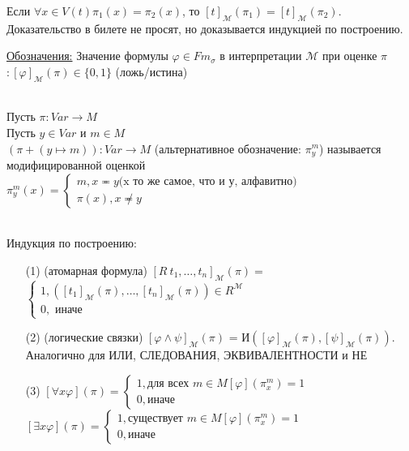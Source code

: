\documentclass[a4paper, fleqn]{article}
\begin{document}
    \begin{lemma}
        Если $∀ x ∈ V(t) \pi_1(x) = \pi_2(x)$, то 
        $[t]_{\mathcal{M}}(\pi_1) = [t]_{\mathcal{M}}(\pi_2)$. \\
        Доказательство в билете не просят,
         но доказывается индукцией по построению.
    \end{lemma}
    \underline{Обозначения:} Значение формулы $\varphi ∈ Fm_{\sigma}$ в интерпретации
    $\mathcal{M}$ при оценке $\pi$ $: [\varphi]_{\mathcal{M}}(\pi) ∈ \{0, 1\}$ (ложь/истина) \\
    \begin{definition} \ \\
        Пусть $\pi: Var → M$ \\
        Пусть $y ∈ Var$ и $m ∈ M$ \\
        $(\pi+(y ↦ m)): Var → M$ (альтернативное обозначение: 
        $\pi_y^m$) называется модифицированной оценкой\\
        $\pi_y^m(x) = \begin{cases}
            m , x \eqcirc y \text{(x то же самое, что и у, алфавитно)} \\
            \pi(x), x \not \eqcirc y
        \end{cases}$ 
    \end{definition}
    \begin{definition} \ \\
        Индукция по построению:
        \begin{itemize}
            \item[(1)] (атомарная формула) 
            $[R\ t_1, \dotsc, t_n]_{\mathcal{M}}(\pi) = $
            $\begin{cases}
                1, \left( [t_1]_{\mathcal{M}}(\pi), \dotsc, 
                [t_n]_{\mathcal{M}}(\pi) \right) ∈ R^{\mathcal{M}} \\
                0, \text{ иначе}
            \end{cases}$
            \item[(2)] (логические связки) 
            $[\varphi ∧ \psi]_{\mathcal{M}}(\pi)$ = 
            И$([\varphi]_{\mathcal{M}}(\pi), [\psi]_{\mathcal{M}}(\pi))$.
            Аналогично для ИЛИ, СЛЕДОВАНИЯ, ЭКВИВАЛЕНТНОСТИ и НЕ
            \item[(3)]
            $[∀ x \varphi](\pi) =
            \begin{cases}
                1, \text{для всех } m ∈ M [\varphi](\pi_x^m) = 1\\
                0, \text{иначе}
            \end{cases}$ \\ 
            $[∃ x \varphi](\pi) =
            \begin{cases}
                1, \text{существует } m ∈ M [\varphi](\pi_x^m) = 1\\
                0, \text{иначе}
            \end{cases}$
        \end{itemize}
    \end{definition}
\end{document}
